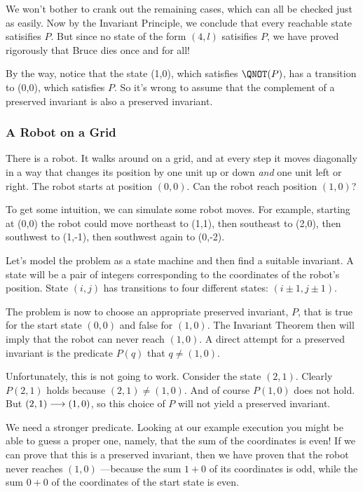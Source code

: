 We won't bother to crank out the remaining cases, which can all be checked
just as easily.  Now by the Invariant Principle, we conclude that every
reachable state satisifies $P$.  But since no state of the form $(4,l)$
satisifies $P$, we have proved rigorously that Bruce dies once and for
all!

By the way, notice that the state (1,0), which satisfies $\QNOT(P)$, has a
transition to (0,0), which satisfies $P$.  So it's wrong to assume that
the complement of a preserved invariant is also a preserved invariant.

\subsubsection{A Robot on a Grid}

There is a robot.  It walks around on a grid, and at every step it moves
diagonally in a way that changes its position by one unit up or down
\emph{and} one unit left or right.  The robot starts at position $(0, 0)$.
Can the robot reach position $(1, 0)$?

To get some intuition, we can simulate some robot moves.  For example,
starting at (0,0) the robot could move northeast to (1,1), then southeast
to (2,0), then southwest to (1,-1), then southwest again to (0,-2).

Let's model the problem as a state machine and then find a suitable
invariant.  A state will be a pair of integers corresponding to the
coordinates of the robot's position.  State $(i,j)$ has transitions to
four different states: $(i \pm 1, j \pm 1)$.

The problem is now to choose an appropriate preserved invariant, $P$, that
is true for the start state $(0,0)$ and false for $(1, 0)$.  The Invariant
Theorem then will imply that the robot can never reach $(1, 0)$.  A direct
attempt for a preserved invariant is the predicate $P(q)$ that $q \neq (1,
0)$.

Unfortunately, this is not going to work.  Consider the state $(2,1)$.
Clearly $P(2,1)$ holds because $(2,1) \neq (1, 0)$.  And of course
$P(1,0)$ does not hold.  But $(2,1) \mathrel{\longrightarrow} (1,0)$, so this choice of $P$
will not yield a preserved invariant.

We need a stronger predicate.  Looking at our example execution you might
be able to guess a proper one, namely, that the sum of the coordinates is
even!  If we can prove that this is a preserved invariant, then we have
proven that the robot never reaches $(1, 0)$ ---because the sum $1+0$ of
its coordinates is odd, while the sum $0+0$ of the coordinates of the
start state is even.


